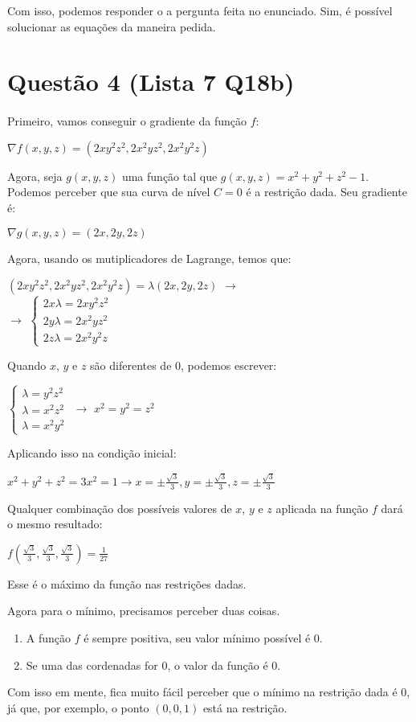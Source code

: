 \documentclass[11pt]{article}
\begin{document}
Com isso, podemos responder o a pergunta feita no
enunciado. Sim, é possível solucionar as equações da
maneira pedida.

\newpage
\section{Questão 4 (Lista 7 Q18b)}
\label{sec:org539618f}
\paragraph{}Primeiro, vamos conseguir o gradiente da função \(f\):

\(\displaystyle\nabla{f(x, y, z)} = (2xy^2z^2, 2x^2yz^2, 2x^2y^2z)\)

Agora, seja \(g(x, y, z)\) uma função tal que
\(g(x, y, z) = x^2+y^2+z^2-1\). Podemos perceber que sua
curva de nível \(C = 0\) é a restrição dada. Seu gradiente
é:

\(\displaystyle\nabla{g(x, y, z)} = (2x, 2y, 2z)\)

Agora, usando os mutiplicadores de Lagrange, temos que:

\((2xy^2z^2, 2x^2yz^2, 2x^2y^2z) = \lambda (2x, 2y, 2z)\) \(\rightarrow\) \\
\(\rightarrow\)
\(\begin{cases}
  2x\lambda = 2xy^2z^2 \\
  2y\lambda = 2x^2yz^2 \\
  2z\lambda = 2x^2y^2z 
  \end{cases}\)

Quando \(x\), \(y\) e \(z\) são diferentes de 0, podemos escrever:

\(\begin{cases}
  \lambda = y^2z^2 \\
  \lambda = x^2z^2 \\
  \lambda = x^2y^2 
  \end{cases}\) \(\rightarrow\) \(x^2=y^2=z^2\)

Aplicando isso na condição inicial:

\(x^2+y^2+z^2 = 3x^2 = 1 \rightarrow 
  x = \pm \frac{\sqrt{3}}{3}, 
  y = \pm \frac{\sqrt{3}}{3}, 
  z = \pm \frac{\sqrt{3}}{3}\)

Qualquer combinação dos possíveis valores de \(x\), \(y\) e \(z\)
aplicada na função \(f\) dará o mesmo resultado:

\(\displaystyle f(\frac{\sqrt{3}}{3}, \frac{\sqrt{3}}{3}, \frac{\sqrt{3}}{3}) = \frac{1}{27}\)

Esse é o máximo da função nas restrições dadas.

Agora para o mínimo, precisamos perceber duas coisas.

\begin{enumerate}
\item A função \(f\) é sempre positiva, seu valor mínimo
possível é 0.
\item Se uma das cordenadas for 0, o valor da função é 0.
\end{enumerate}

Com isso em mente, fica muito fácil perceber que o mínimo
na restrição dada é 0, já que, por exemplo, o ponto \((0, 0, 1)\)
está na restrição.
\end{document}
